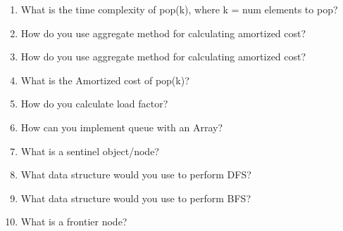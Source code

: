 \documentclass[11pt, letterpaper]{article}
\begin{document}
\begin{enumerate}[leftmargin=*, label=\textbf{\arabic*.}]
  \item What is the time complexity of pop(k), where k = num elements to pop?
    \begin{answerspace}
    \end{answerspace}

  \item How do you use aggregate method for calculating amortized cost?
    \begin{answerspace}
    \end{answerspace}

  \item How do you use aggregate method for calculating amortized cost?
    \begin{answerspace}
    \end{answerspace}

  \item What is the Amortized cost of pop(k)?
    \begin{answerspace}
    \end{answerspace}

  \item How do you calculate load factor?
    \begin{answerspace}
    \end{answerspace}

  \item How can you implement queue with an Array?
    \begin{answerspace}
    \end{answerspace}

  \item What is a sentinel object/node?
    \begin{answerspace}
    \end{answerspace}

  \item What data structure would you use to perform DFS?
    \begin{answerspace}
    \end{answerspace}

  \item What data structure would you use to perform BFS?
    \begin{answerspace}
    \end{answerspace}

  \item What is a frontier node?
    \begin{answerspace}
    \end{answerspace}


\end{enumerate}
\end{document}
